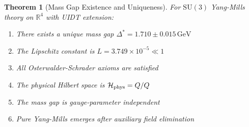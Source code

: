 \documentclass[11pt,a4paper]{article}
\providecommand{\R}{\mathbb{R}}
\providecommand{\Hilbert}{\mathcal{H}}
\let\im\relax
\let\ke\relax
\DeclareMathOperator{\im}{im}
\DeclareMathOperator{\ke}{ker}
\theoremstyle{plain}
\newtheorem{theorem}{Theorem}[section]
\theoremstyle{definition}
\begin{document}
\begin{theorem}[Mass Gap Existence and Uniqueness]
\label{thm:main}
For $\mathrm{SU}(3)$ Yang-Mills theory on $\R^4$ with UIDT extension:
\begin{enumerate}[label=(\alph*)]
\item There exists a unique mass gap $\Delta^* = 1.710 \pm 0.015\,\mathrm{GeV}$
\item The Lipschitz constant is $L = 3.749 \times 10^{-5} \ll 1$
\item All Osterwalder-Schrader axioms are satisfied
\item The physical Hilbert space is $\Hilbert_{\mathrm{phys}} = \ke Q / \im Q$
\item The mass gap is gauge-parameter independent
\item Pure Yang-Mills emerges after auxiliary field elimination
\end{enumerate}
\end{theorem}
\vspace{0.3em}
\end{document}
